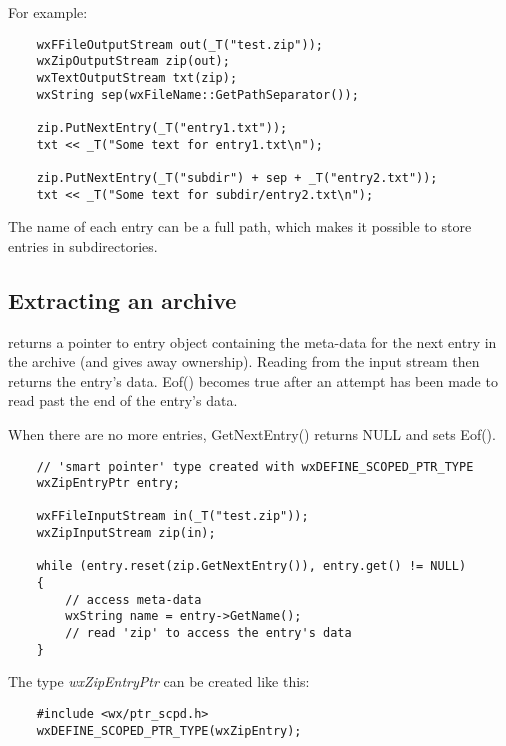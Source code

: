 For example:

\begin{verbatim}
    wxFFileOutputStream out(_T("test.zip"));
    wxZipOutputStream zip(out);
    wxTextOutputStream txt(zip);
    wxString sep(wxFileName::GetPathSeparator());

    zip.PutNextEntry(_T("entry1.txt"));
    txt << _T("Some text for entry1.txt\n");

    zip.PutNextEntry(_T("subdir") + sep + _T("entry2.txt"));
    txt << _T("Some text for subdir/entry2.txt\n");

\end{verbatim}

The name of each entry can be a full path, which makes it possible to
store entries in subdirectories.


\subsection{Extracting an archive}\label{wxarcextract}


 returns a pointer
to entry object containing the meta-data for the next entry in the archive
(and gives away ownership). Reading from the input stream then returns the
entry's data. Eof() becomes true after an attempt has been made to read past
the end of the entry's data.

When there are no more entries, GetNextEntry() returns NULL and sets Eof().

\begin{verbatim}
    // 'smart pointer' type created with wxDEFINE_SCOPED_PTR_TYPE
    wxZipEntryPtr entry;

    wxFFileInputStream in(_T("test.zip"));
    wxZipInputStream zip(in);

    while (entry.reset(zip.GetNextEntry()), entry.get() != NULL)
    {
        // access meta-data
        wxString name = entry->GetName();
        // read 'zip' to access the entry's data
    }

\end{verbatim}

The  type {\em wxZipEntryPtr}
can be created like this:

\begin{verbatim}
    #include <wx/ptr_scpd.h>
    wxDEFINE_SCOPED_PTR_TYPE(wxZipEntry);

\end{verbatim}



